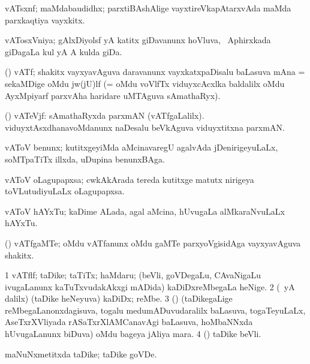 {\bentry
{} 
\gl{\nA}
\expl{}
\bmng
vATsxnf; maMdabaudidhx; parxtiBAshAlige vayxtireVkapAtarxvAda maMda parxkaqtiya vayxkitx. 
\emng
\eentry

\bentry
{} 
\gl{\nA}
\expl{}
\bmng
vATosxVniya; gAlxDiyolsf yA katitx giDavanunx hoVluva, \da\ Aphirxkada giDagaLa kul yA A kulda giDa. 
\emng
\eentry

\bentry
{} 
\gl{\nA}
\expl{}
\bmng
(\Bwvi) vATf; shakitx vayxyavAguva daravanunx vayxkatxpaDisalu baLasuva mAna = sekaMDige oMdu jw(jU)lf (= oMdu voVlfTx viduyxcAcxlka baldalilx oMdu AyxMpiyarf parxvAha haridare uMTAguva sAmathaRyx). 
\emng
\eentry

\bentry
{} 
\gl{\nA}
\expl{}
\bmng
(\Bwvi) vATeVjf: 
\banum
{} sAmathaRyxda parxmAN (vATfgaLalilx). 
 viduyxtAsxdhanavoMdanunx naDesalu beVkAguva viduyxtitxna parxmAN. 
\eanum
\emng
\eentry

\bentry
{} 
\gl{\nA}
\expl{}
\bmng
vAToV benunx; kutitxgeyiMda aMcinavaregU agalvAda jDenirigeyuLaLx, soMTpaTiTx illxda, uDupina benunxBAga. 
\emng
\eentry

\bentry
{} 
\gl{\nA}
\expl{}
\bmng
vAToV oLagupapxsa; cwkAkArada tereda kutitxge matutx nirigeya toVLutudiyuLaLx oLagupapxsa. 
\emng
\eentry

\bentry
{} 
\gl{\nA}
\expl{}
\bmng
vAToV hAYxTu; kaDime ALada, agal aMcina, hUvugaLa alMkaraNvuLaLx hAYxTu. 
\emng
\eentry

\bentry
{} 
\gl{\nA}
\expl{}
\bmng
(\viduyx) vATfgaMTe; oMdu vATfanunx oMdu gaMTe parxyoVgisidAga vayxyavAguva shakitx. 
\emng
\eentry

\bentry
{} 
\gl{\nA}
\expl{}
\bmng
\bnum
\num{1} vATflf; taDike; taTiTx; haMdaru; (beVli, goVDegaLu, CAvaNigaLu ivugaLanunx kaTuTxvudakAkxgi mADida) kaDiDxreMbegaLa heNige. 
\num{2} (\Eva\ yA \bava dalilx) (taDike heNeyuva) kaDiDx; reMbe. 
\num{3} (\AseTxrXV) (taDikegaLige reMbegaLanonxdagisuva, togalu medumADuvudaralilx baLasuva, togaTeyuLaLx, AseTxrXVliyada rASaTxrXlAMCanavAgi baLasuva, hoMbaNNxda hUvugaLanunx biDuva) oMdu bageya jAliya mara. 
\num{4} (\pArxM) taDike beVli. 
\enum
\emng

\noindent 
\gl{\pagu}
\expl{}
\bmng
{} maNuNxmetitxda taDike; taDike goVDe. 
\emng
\eentry

}
